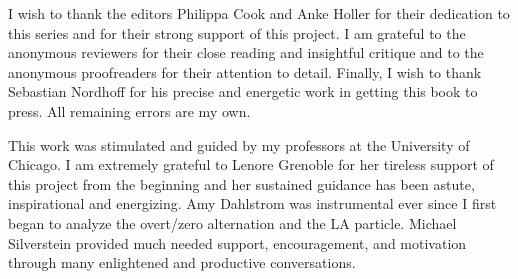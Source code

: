 \begin{refsection}

I wish to thank the editors Philippa Cook and Anke Holler for their dedication to this series and for their strong support of this project. I am grateful to the anonymous reviewers for their close reading and insightful critique and to the anonymous proofreaders for their attention to detail. Finally, I wish to thank Sebastian Nordhoff for his precise and energetic work in getting this book to press. All remaining errors are my own.

This work was stimulated and guided by my professors at the University of Chicago. I am extremely grateful to Lenore Grenoble for her tireless support of this project from the beginning and her sustained guidance has been astute, inspirational and energizing. Amy Dahlstrom was instrumental ever since I first began to analyze the overt/zero  alternation and the LA particle. Michael Silverstein provided much needed support, encouragement, and motivation through many enlightened and productive conversations.



\end{refsection}
